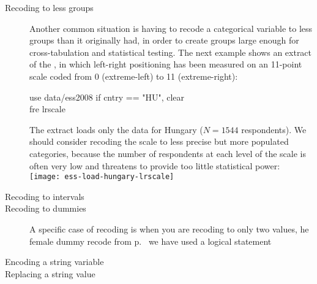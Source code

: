 \begin{description}
	\item[Recoding to less groups]%
Another common situation is having to recode a categorical variable to less groups than it originally had, in order to create groups large enough for cross-tabulation and statistical testing. The next example shows an extract of the \ess, in which left-right positioning has been measured on an 11-point scale coded from 0 (extreme-left) to 11 (extreme-right):

\begin{docspec}
	use data/ess2008 if cntry == "HU", clear\\
	fre lrscale
\end{docspec}

The extract loads only the data for Hungary ($N = 1544$ respondents). We should consider recoding the scale to less precise but more populated categories, because the number of respondents at each level of the scale is often very low and threatens to provide too little statistical power:\\[1em]

	\texttt{[image: ess-load-hungary-lrscale]}\\[1em]

	\item[Recoding to intervals]%

	\item[Recoding to dummies]%
A specific case of recoding is when you are recoding to only two values, he female dummy recode from p.~\pageref{female-dummy} we have used a logical statement

	\item[Encoding a string variable]%
	
	\item[Replacing a string value]%
	
\end{description}